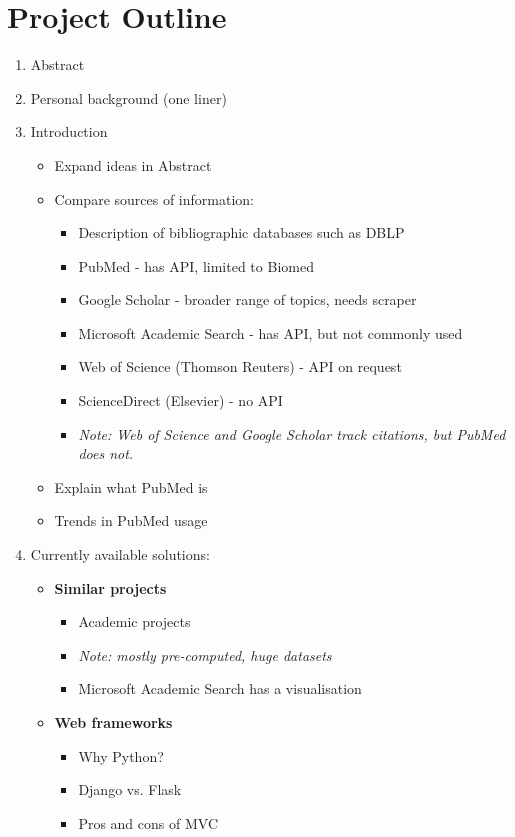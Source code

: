 \documentclass[a4paper,12pt]{article}
\begin{document}
\section{Project Outline}
\begin{enumerate}
	\item Abstract
	\item Personal background (one liner)
	\item Introduction
	\begin{itemize}
		\item Expand ideas in Abstract						
		\item Compare sources of information: 
		\begin{itemize}
			\item Description of bibliographic databases such as DBLP
			\item PubMed - has API, limited to Biomed
			\item Google Scholar - broader range of topics, needs scraper
			\item Microsoft Academic Search - has API, but not commonly used
			\item Web of Science (Thomson Reuters) - API on request
			\item ScienceDirect (Elsevier) - no API
			\item \emph{Note: Web of Science and Google Scholar track citations, but PubMed does not.}
		\end{itemize}
		\item Explain what PubMed is
		\item Trends in PubMed usage
		\end{itemize}
	\item Currently available solutions:
	\begin{itemize}
		\item \textbf{Similar projects}
		\begin{itemize}
			\item Academic projects 
			\item \emph{Note: mostly pre-computed, huge datasets}
			\item Microsoft Academic Search has a visualisation
		\end{itemize}
		\item \textbf{Web frameworks}
		\begin{itemize}
			\item Why Python?
			\item Django vs. Flask
			\item Pros and cons of MVC
		\end{itemize}

\end{itemize}
\end{enumerate}
\end{document}
